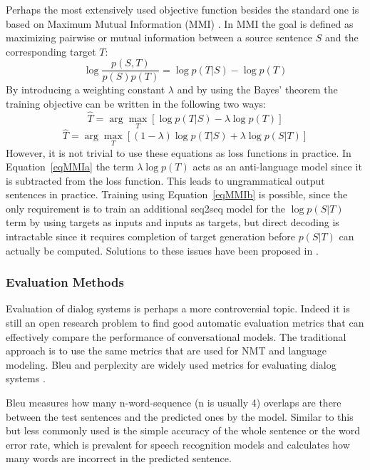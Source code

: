 \documentclass[12pt]{article}
\begin{document}
Perhaps the most extensively used objective function besides the standard one is based on Maximum Mutual Information (MMI) \cite{Li:2015}. In MMI the goal is defined as maximizing pairwise or mutual information between a source sentence \(S\) and the corresponding target \(T\):
\begin{equation}
\log{\frac{p(S,T)}{p(S)p(T)}}=\log{p(T|S)}-\log{p(T)}
\end{equation}
By introducing a weighting constant \(\lambda\) and by using the Bayes' theorem the training objective can be written in the following two ways:
\begin{equation} \label{eqMMIa}
\hat{T}=\arg\max_{T}[\log{p(T|S)}-\lambda\log{p(T)}]
\end{equation}
\begin{equation} \label{eqMMIb}
\hat{T}=\arg\max_{T}[(1-\lambda)\log{p(T|S)}+\lambda\log{p(S|T)}]
\end{equation}
However, it is not trivial to use these equations as loss functions in practice. In Equation~\ref{eqMMIa} the term \(\lambda\log{p(T)}\) acts as an anti-language model since it is subtracted from the loss function. This leads to ungrammatical output sentences in practice. Training using Equation~\ref{eqMMIb} is possible, since the only requirement is to train an additional seq2seq model for the \(\log{p(S|T)}\) term by using targets as inputs and inputs as targets, but direct decoding is intractable since it requires completion of target generation before \(p(S|T)\) can actually be computed. Solutions to these issues have been proposed in \cite{Li:2015}.

\subsubsection{Evaluation Methods} \label{sssec:eval}
Evaluation of dialog systems is perhaps a more controversial topic. Indeed it is still an open research problem to find good automatic evaluation metrics that can effectively compare the performance of conversational models. The traditional approach is to use the same metrics that are used for NMT and language modeling. Bleu and perplexity are widely used metrics for evaluating dialog systems \cite{Vinyals:2015,Yao:2016,Zhao:2017,Serban:2015}. 

Bleu \cite{Papineni:2002} measures how many n-word-sequence (n is usually 4) overlaps are there between the test sentences and the predicted ones by the model. Similar to this but less commonly used is the simple accuracy of the whole sentence or the word error rate, which is prevalent for speech recognition models \cite{Shannon:2017,Park:2008} and calculates how many words are incorrect in the predicted sentence.
\end{document}
